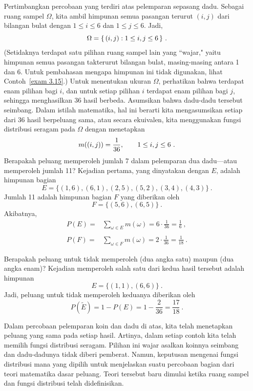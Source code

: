 \begin{example}\label{exam 1.11}
Pertimbangkan percobaan yang terdiri atas pelemparan sepasang dadu.  Sebagai
ruang
sampel $\Omega$, kita ambil himpunan semua pasangan terurut $(i,j)$ dari
bilangan bulat dengan $1\leq i\leq 6$ dan $1\leq j\leq 6$.  Jadi,
$$
\Omega = \{\,(i,j):1\leq i,\space j \leq 6\,\}\ .
$$
(Setidaknya terdapat satu pilihan ruang sampel lain yang ``wajar," yaitu
himpunan semua pasangan takterurut bilangan bulat, masing-masing antara 1 dan 6.  Untuk pembahasan
mengapa himpunan ini tidak digunakan, lihat Contoh~\ref{exam 3.15}.)
Untuk menentukan ukuran $\Omega$, perhatikan bahwa terdapat enam pilihan bagi $i$,
dan untuk setiap pilihan $i$ terdapat enam pilihan bagi $j$, sehingga menghasilkan 36
hasil berbeda.  Asumsikan bahwa dadu-dadu tersebut seimbang.  Dalam istilah matematika, hal ini
berarti
kita mengasumsikan setiap dari 36 hasil berpeluang sama, atau
secara ekuivalen,
kita menggunakan fungsi distribusi seragam pada $\Omega$ dengan menetapkan
$$
m((i,j)) = \frac1{36},\qquad 1\leq i,\space j \leq 6\ .
$$
Berapakah peluang memperoleh jumlah 7 dalam pelemparan dua dadu---atau
memperoleh jumlah 11?  Kejadian pertama, yang dinyatakan dengan $E$, adalah himpunan bagian
$$
E = \{(1,6),(6,1),(2,5),(5,2),(3,4),(4,3)\}\ .
$$
Jumlah 11 adalah himpunan bagian $F$ yang diberikan oleh
$$
F = \{(5,6),(6,5)\}\ .
$$
Akibatnya,
$$\begin{array}{ll}
P(E) = &\sum_{\omega \in E} m(\omega) = 6\cdot\frac1{36} = \frac16\ , \\
       &                                                            \\
P(F) = &\sum_{\omega \in F} m(\omega) = 2\cdot\frac1{36} = \frac1{18}\ .
\end{array}
$$

Berapakah peluang untuk tidak memperoleh  (dua angka satu)
maupun
 (dua angka enam)?  Kejadian memperoleh salah satu dari kedua
hasil tersebut adalah himpunan
$$
E = \{(1,1),(6,6)\}\ .
$$
Jadi, peluang untuk tidak memperoleh keduanya diberikan oleh
$$
P(\tilde E) = 1 - P(E) = 1 - \frac2{36} = \frac{17}{18}\ .
$$
\end{example}
\par
Dalam percobaan pelemparan koin dan dadu di atas, kita telah menetapkan
peluang yang sama pada setiap hasil.  Artinya, dalam setiap contoh kita telah memilih
fungsi distribusi seragam.  Pilihan ini wajar asalkan
koinnya seimbang dan dadu-dadunya tidak diberi pemberat.  Namun, keputusan mengenai
fungsi distribusi mana yang dipilih untuk menjelaskan suatu percobaan  bagian
dari teori matematika dasar peluang.  Teori tersebut baru dimulai ketika
ruang sampel dan fungsi distribusi telah didefinisikan.

